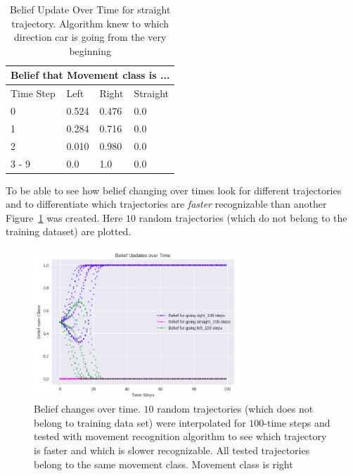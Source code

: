 \begin{table}[h!]
	\centering
	\begin{tabular}{ |p{1.5cm}||p{1.5cm}|p{1.5cm}|p{1.5cm}|}
		\hline
		\multicolumn{4}{|c|}{Belief that Movement class is ...} \\
		\hline
		Time Step & Left & Right & Straight \\
		\hline
		0 & 0.524 & 0.476 & 0.0 \\
		1 & 0.284 & 0.716 & 0.0 \\
		2 & 0.010 & 0.980 & 0.0 \\
		3 - 9 & 0.0   & 1.0   & 0.0 \\
		\hline
	\end{tabular}
	\caption{Belief Update Over Time for straight trajectory. Algorithm knew to which direction car is going from the very beginning}
	\label{table:BelifRightT}
\end{table}



To be able to see how belief changing over times look for different trajectories and to differentiate which trajectories are \textit{faster} recognizable than another Figure~\ref{fig:10RightsT} was created. Here $10$ random trajectories (which do not belong to the training dataset) are plotted.

\begin{figure}[H]
	\centering  	
	\includegraphics[width=8cm]{img/NetRightT.png}
	\caption{Belief changes over time. $10$ random trajectories (which does not belong to training data set) were interpolated for $100$-time steps and tested with movement recognition algorithm to see which trajectory is faster and which is slower recognizable. All tested trajectories belong to the same movement class. Movement class is right}
	\label{fig:10RightsT}    
\end{figure}

